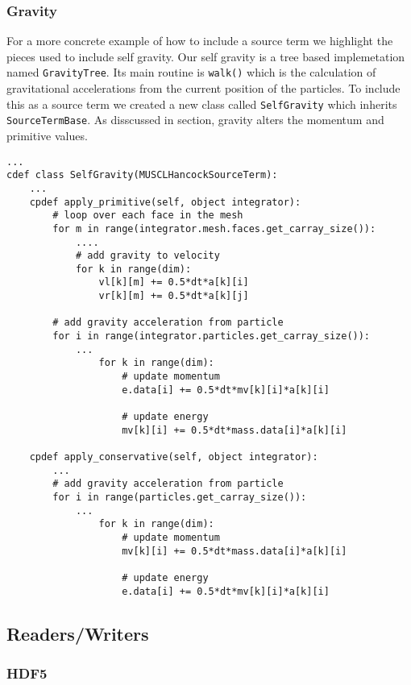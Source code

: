 \subsubsection{Gravity}
For a more concrete example of how to include a source term we highlight the
pieces used to include self gravity. Our self gravity is a tree based implemetation
named \lstinline{GravityTree}. Its main routine is \lstinline{walk()} which is the
calculation of gravitational accelerations from the current position of the particles.
To include this as a source term we created a new class called \lstinline{SelfGravity}
which inherits \lstinline{SourceTermBase}. As disscussed in section, gravity alters
the momentum and primitive values.
\begin{lstlisting}
...
cdef class SelfGravity(MUSCLHancockSourceTerm):
    ...
    cpdef apply_primitive(self, object integrator):
        # loop over each face in the mesh 
        for m in range(integrator.mesh.faces.get_carray_size()):
            ....
            # add gravity to velocity
            for k in range(dim):
                vl[k][m] += 0.5*dt*a[k][i]
                vr[k][m] += 0.5*dt*a[k][j]

        # add gravity acceleration from particle
        for i in range(integrator.particles.get_carray_size()):
            ...
                for k in range(dim):
                    # update momentum
                    e.data[i] += 0.5*dt*mv[k][i]*a[k][i]

                    # update energy 
                    mv[k][i] += 0.5*dt*mass.data[i]*a[k][i]

    cpdef apply_conservative(self, object integrator):
        ...
        # add gravity acceleration from particle
        for i in range(particles.get_carray_size()):
            ...
                for k in range(dim):
                    # update momentum
                    mv[k][i] += 0.5*dt*mass.data[i]*a[k][i]

                    # update energy 
                    e.data[i] += 0.5*dt*mv[k][i]*a[k][i]
\end{lstlisting}

\subsection{Readers/Writers}
\subsubsection{HDF5}

